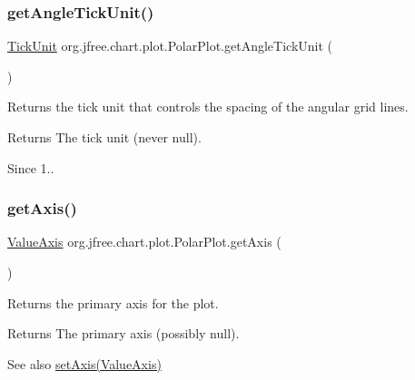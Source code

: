 \subsubsection{\texorpdfstring{get\+Angle\+Tick\+Unit()}{getAngleTickUnit()}}
{\footnotesize\ttfamily \mbox{\hyperlink{classorg_1_1jfree_1_1chart_1_1axis_1_1_tick_unit}{Tick\+Unit}} org.\+jfree.\+chart.\+plot.\+Polar\+Plot.\+get\+Angle\+Tick\+Unit (\begin{DoxyParamCaption}{ }\end{DoxyParamCaption})}

Returns the tick unit that controls the spacing of the angular grid lines.

\begin{DoxyReturn}{Returns}
The tick unit (never {\ttfamily null}).
\end{DoxyReturn}
\begin{DoxySince}{Since}
1.. 
\end{DoxySince}
\mbox{\label{classorg_1_1jfree_1_1chart_1_1plot_1_1_polar_plot_aa23feb5967de898ada3d412c9d614825}} 
\subsubsection{\texorpdfstring{get\+Axis()}{getAxis()}\hspace{0.1cm}{\footnotesize\ttfamily [1/2]}}
{\footnotesize\ttfamily \mbox{\hyperlink{classorg_1_1jfree_1_1chart_1_1axis_1_1_value_axis}{Value\+Axis}} org.\+jfree.\+chart.\+plot.\+Polar\+Plot.\+get\+Axis (\begin{DoxyParamCaption}{ }\end{DoxyParamCaption})}

Returns the primary axis for the plot.

\begin{DoxyReturn}{Returns}
The primary axis (possibly {\ttfamily null}).
\end{DoxyReturn}
\begin{DoxySeeAlso}{See also}
\mbox{\hyperlink{classorg_1_1jfree_1_1chart_1_1plot_1_1_polar_plot_a31e8be5c37523541ee64ce073dcf4f52}{set\+Axis(\+Value\+Axis)}} 
\end{DoxySeeAlso}
\mbox{\label{classorg_1_1jfree_1_1chart_1_1plot_1_1_polar_plot_a354b78f6c68b444dcb767395ac2943f8}} 
